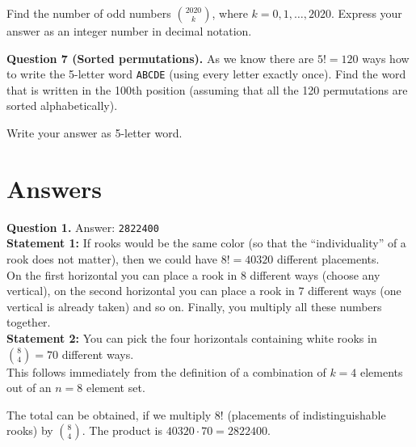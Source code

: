 \documentclass[jou]{apa6}
\begin{document}
Find the number of odd numbers ${2020 \choose k}$, where $k = 0,1,\ldots,2020$. 
Express your answer as an integer number in decimal notation.


\vspace{6pt}
{\bf Question 7 (Sorted permutations).} As we know there are $5! = 120$ ways how to write the 5-letter word
{\tt ABCDE} (using every letter exactly once). Find the word that is written in the 100th position (assuming that
all the 120 permutations are sorted alphabetically).

Write your answer as 5-letter word.



\newpage

\section{Answers}

\vspace{4pt}
{\bf Question 1.} Answer: {\tt 2822400}\\
{\bf Statement 1:} If rooks would be the same color (so that the ``individuality'' of a rook 
does not matter), then we could have $8! = 40320$ different placements.\\
On the first horizontal you can place a rook in $8$ different ways (choose any vertical), 
on the second horizontal you can place a rook in $7$ different ways (one vertical is already taken) and so on. 
Finally, you multiply all these numbers together.\\
{\bf Statement 2:} You can pick the four horizontals containing white rooks in ${8 \choose 4} = 70$ different ways.\\
This follows immediately from the definition of a combination of $k=4$ elements out of an $n=8$ element set.

The total can be obtained, if we multiply $8!$ (placements of indistinguishable rooks) by ${8 \choose 4}$. 
The product is $40320 \cdot 70 = 2822400$.
\end{document}
